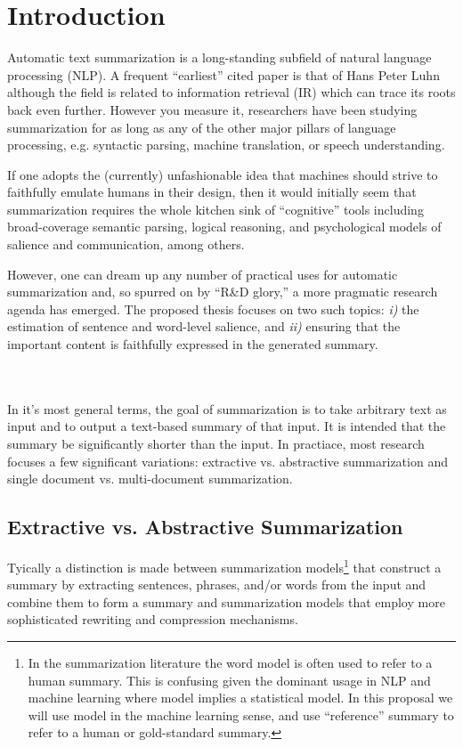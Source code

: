 \section{Introduction}

Automatic text summarization is a long-standing subfield of natural language
processing (NLP). A frequent ``earliest'' cited paper is that of Hans Peter 
Luhn \cite{luhn1958automatic} although the field is related to information
retrieval (IR) which can trace its roots back even further. However you
measure it, researchers have been studying summarization for as long
as any of the other major pillars of language processing, e.g. syntactic
parsing, machine translation, or speech understanding. 

If one adopts the (currently) unfashionable idea that machines should 
strive to faithfully emulate humans in their design, then it would initially
seem that summarization requires the whole kitchen sink of ``cognitive''
tools including broad-coverage semantic parsing, logical reasoning, 
and psychological models of salience and communication, among others.

However, one can dream up any number of practical uses for automatic 
summarization and, so spurred on by ``R\&D glory,'' a more pragmatic research 
agenda has emerged. The proposed thesis focuses on two such topics:
\textit{i)} the estimation of sentence and word-level salience, and 
\textit{ii)} ensuring that the important content is faithfully expressed 
in the generated summary.

~\\
~\\


In it's most general terms, the goal of summarization is to take arbitrary
text as input and to output a text-based summary of that input. It is
intended that the summary be significantly shorter than the input. 
In practiace, most research focuses a few significant variations:
extractive vs. abstractive summarization and 
single document vs. multi-document summarization. 


\subsection{Extractive vs. Abstractive Summarization}

Tyically a distinction is made between summarization models\footnote{In the
summarization literature the word model is often used to refer to a human 
summary. This is confusing given the dominant usage in NLP and machine learning where model implies a statistical model. In this proposal we will use model
in the machine learning sense, and use ``reference'' summary to refer to a 
human or gold-standard summary. } that construct a summary by extracting
sentences, phrases, and/or words from the input and combine them to
form a summary and summarization models that employ more
sophisticated rewriting and compression mechanisms.

